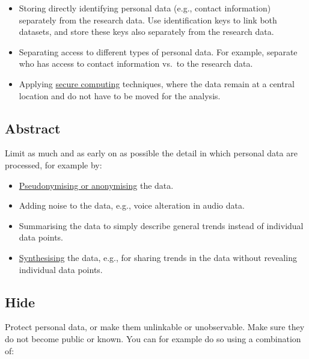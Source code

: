 \documentclass[
]{book}
\providecommand{\tightlist}{%
  \setlength{\itemsep}{0pt}\setlength{\parskip}{0pt}}
\begin{document}
\begin{itemize}
\tightlist
\item
  Storing directly identifying personal data (e.g., contact information)
  separately from the research data. Use identification keys to link both datasets,
  and store these keys also separately from the research data.
\item
  Separating access to different types of personal data. For example, separate
  who has access to contact information vs.~to the research data.
\item
  Applying \protect\hyperlink{secure-computing}{secure computing} techniques, where
  the data remain at a central location and do not have to be moved for the analysis.
\end{itemize}

\hypertarget{abstract}{%
\subsection{Abstract}\label{abstract}}

Limit as much and as early on as possible the detail in which personal data
are processed, for example by:

\begin{itemize}
\tightlist
\item
  \protect\hyperlink{pseudonymisation-anonymisation}{Pseudonymising or anonymising} the data.
\item
  Adding noise to the data, e.g., voice alteration in audio data.
\item
  Summarising the data to simply describe general trends instead of individual
  data points.
\item
  \protect\hyperlink{synthetic-data}{Synthesising} the data, e.g., for sharing trends
  in the data without revealing individual data points.
\end{itemize}

\hypertarget{hide}{%
\subsection{Hide}\label{hide}}

Protect personal data, or make them unlinkable or unobservable. Make sure they
do not become public or known. You can for example do so using a combination of:
\end{document}

